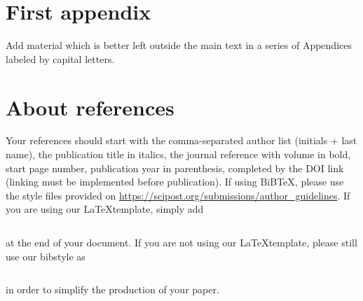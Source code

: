 \documentclass[submission, Phys]{SciPost}
\begin{document}
\begin{appendix}

\section{First appendix}
Add material which is better left outside the main text in a series of Appendices labeled by capital letters.

\section{About references}
Your references should start with the comma-separated author list (initials + last name), the publication title in italics, the journal reference with volume in bold, start page number, publication year in parenthesis, completed by the DOI link (linking must be implemented before publication). If using BiBTeX, please use the style files provided  on \url{https://scipost.org/submissions/author_guidelines}. If you are using our \LaTeX template, simply add
\begin{verbatim}

\end{verbatim}
at the end of your document. If you are not using our \LaTeX template, please still use our bibstyle as
\begin{verbatim}

\end{verbatim}
in order to simplify the production of your paper.
\end{appendix}






\nolinenumbers
\end{document}
